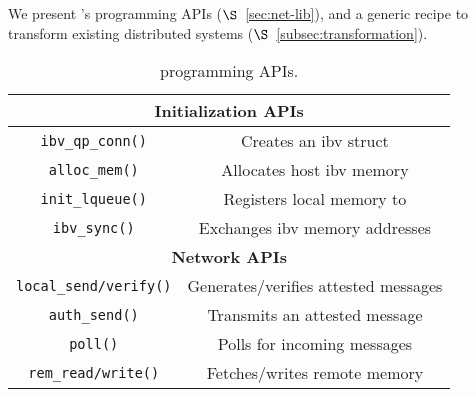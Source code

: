 \section{}
\label{sec:t-nic-software}
We present \projecttitle{}'s programming APIs ($\S$~\ref{sec:net-lib}), and a generic recipe to transform existing distributed systems ($\S$~\ref{subsec:transformation}).

\begin{table}
\begin{center}
\footnotesize
\begin{tabular}{ |c|c| } 
 \hline
 \multicolumn{2}{|c|}{{\bf Initialization APIs}} \\ [0.5ex] \hline 
 {\tt ibv\_qp\_conn()} & Creates an ibv struct \\
 {\tt alloc\_mem()}    & Allocates host ibv memory \\
 {\tt init\_lqueue()}    & Registers local memory to \projecttitle{} \\
 {\tt ibv\_sync()} & Exchanges ibv memory addresses \\
 \hline
 \hline
 \multicolumn{2}{|c|}{{\bf Network APIs}} \\ [0.5ex] \hline 
 {\tt local\_send/verify()}    & Generates/verifies attested messages \\
 {\tt auth\_send()} &  Transmits an attested message \\
 {\tt poll()} &  Polls for incoming messages \\
 {\tt rem\_read/write()} &  Fetches/writes remote memory \\
 \hline
\end{tabular}
\end{center}
\caption{\projecttitle{} programming APIs.}
\label{tab:apis}
\vspace{-10pt}
\end{table}



